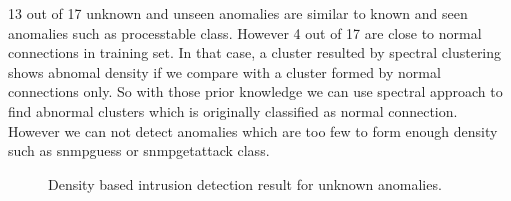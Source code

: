 13 out of 17 unknown and unseen anomalies are similar to known and seen anomalies such as processtable class. 
However 4 out of 17 are close to normal connections in training set. 
In that case, a cluster resulted by spectral clustering shows abnomal density if we compare with a cluster formed by normal connections only. 
So with those prior knowledge we can use spectral approach to find abnormal clusters which is originally classified as normal connection. 
However we can not detect anomalies which are too few to form enough density such as snmpguess or snmpgetattack class. 
\begin{figure}[htb2]
\begin{center}
\end{center}
\caption{Density based intrusion detection result for unknown anomalies.} %
\label{fig:refSingleRobot1}
\end{figure}


